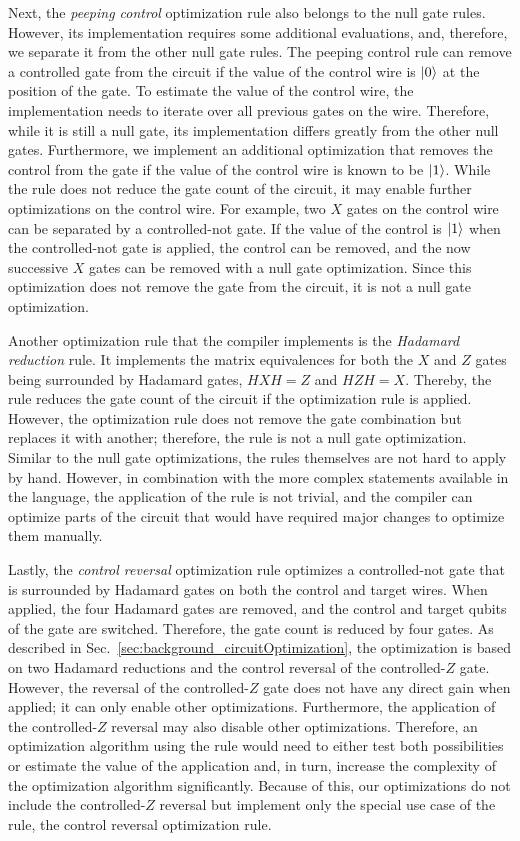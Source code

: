 Next, the \emph{peeping control} optimization rule also belongs to the null gate rules. However, its implementation requires some additional evaluations, and, therefore, we separate it from the other null gate rules. The peeping control rule can remove a controlled gate from the circuit if the value of the control wire is $\ket{0}$ at the position of the gate. To estimate the value of the control wire, the implementation needs to iterate over all previous gates on the wire. Therefore, while it is still a null gate, its implementation differs greatly from the other null gates. Furthermore, we implement an additional optimization that removes the control from the gate if the value of the control wire is known to be $\ket{1}$. While the rule does not reduce the gate count of the circuit, it may enable further optimizations on the control wire. For example, two $X$ gates on the control wire can be separated by a controlled-not gate. If the value of the control is $\ket{1}$ when the controlled-not gate is applied, the control can be removed, and the now successive $X$ gates can be removed with a null gate optimization. Since this optimization does not remove the gate from the circuit, it is not a null gate optimization.

Another optimization rule that the compiler implements is the \emph{Hadamard reduction} rule. It implements the matrix equivalences for both the $X$ and $Z$ gates being surrounded by Hadamard gates, $HXH = Z$ and $HZH = X$. Thereby, the rule reduces the gate count of the circuit if the optimization rule is applied. However, the optimization rule does not remove the gate combination but replaces it with another; therefore, the rule is not a null gate optimization. 
Similar to the null gate optimizations, the rules themselves are not hard to apply by hand. However, in combination with the more complex statements available in the language, the application of the rule is not trivial, and the compiler can optimize parts of the circuit that would have required major changes to optimize them manually.

Lastly, the \emph{control reversal} optimization rule optimizes a controlled-not gate that is surrounded by Hadamard gates on both the control and target wires. When applied, the four Hadamard gates are removed, and the control and target qubits of the gate are switched. Therefore, the gate count is reduced by four gates. As described in Sec.~\ref{sec:background_circuitOptimization}, the optimization is based on two Hadamard reductions and the control reversal of the controlled-$Z$ gate. However, the reversal of the controlled-$Z$ gate does not have any direct gain when applied; it can only enable other optimizations. Furthermore, the application of the controlled-$Z$ reversal may also disable other optimizations. Therefore, an optimization algorithm using the rule would need to either test both possibilities or estimate the value of the application and, in turn, increase the complexity of the optimization algorithm significantly. Because of this, our optimizations do not include the controlled-$Z$ reversal but implement only the special use case of the rule, the control reversal optimization rule.

